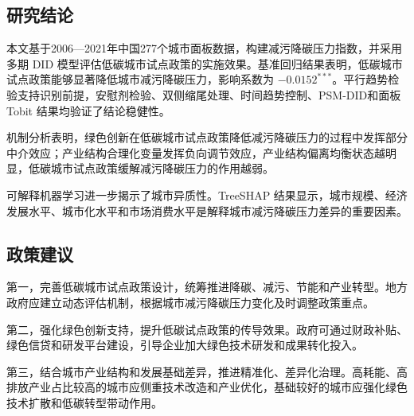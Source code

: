\documentclass[12pt,a4paper]{ctexart}
\begin{document}
\subsection{研究结论}

本文基于2006—2021年中国277个城市面板数据，构建减污降碳压力指数，并采用多期 DID 模型评估低碳城市试点政策的实施效果。基准回归结果表明，低碳城市试点政策能够显著降低城市减污降碳压力，影响系数为 $-0.0152^{***}$。平行趋势检验支持识别前提，安慰剂检验、双侧缩尾处理、时间趋势控制、PSM-DID和面板 Tobit 结果均验证了结论稳健性。

机制分析表明，绿色创新在低碳城市试点政策降低减污降碳压力的过程中发挥部分中介效应；产业结构合理化变量发挥负向调节效应，产业结构偏离均衡状态越明显，低碳城市试点政策缓解减污降碳压力的作用越弱。

可解释机器学习进一步揭示了城市异质性。TreeSHAP 结果显示，城市规模、经济发展水平、城市化水平和市场消费水平是解释城市减污降碳压力差异的重要因素。

\subsection{政策建议}

第一，完善低碳城市试点政策设计，统筹推进降碳、减污、节能和产业转型。地方政府应建立动态评估机制，根据城市减污降碳压力变化及时调整政策重点。

第二，强化绿色创新支持，提升低碳试点政策的传导效果。政府可通过财政补贴、绿色信贷和研发平台建设，引导企业加大绿色技术研发和成果转化投入。

第三，结合城市产业结构和发展基础差异，推进精准化、差异化治理。高耗能、高排放产业占比较高的城市应侧重技术改造和产业优化，基础较好的城市应强化绿色技术扩散和低碳转型带动作用。
\end{document}

